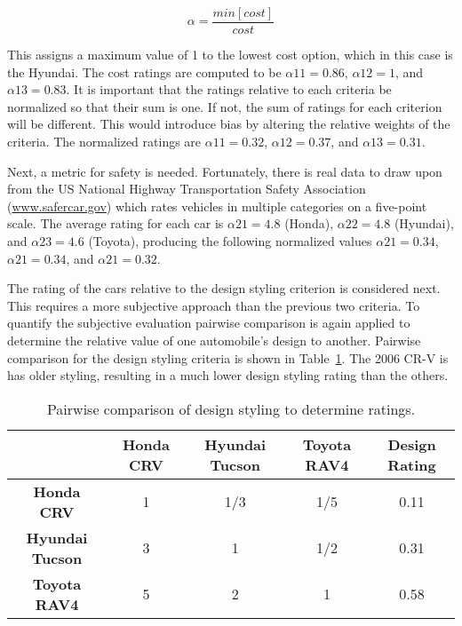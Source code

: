 \begin{equation}
\label{equ:costRatio}
\alpha = \frac{min[cost]}{cost}
\end{equation}

This assigns a maximum value of 1 to the lowest cost option, which in
this case is the Hyundai. The cost ratings are computed to be
$\alpha{11} = 0.86$,
$\alpha{12} =  1$, and
$\alpha{13} =  0.83$. It is important that the
ratings relative to each criteria be normalized so that their sum is
one. If not, the sum of ratings for each criterion will be different.
This would introduce bias by altering the relative weights of the
criteria. The normalized ratings are
$\alpha{11} =  0.32$,
$\alpha{12} =  0.37$, and
$\alpha{13} =  0.31$.

Next, a metric for safety is needed. Fortunately, there is real data to
draw upon from the US National Highway Transportation Safety Association
(\href{http://www.safercar.gov}{www.safercar.gov}) which rates vehicles
in multiple categories on a five-point scale. The average rating for
each car is 
$\alpha{21} =  4.8$ (Honda),
$\alpha{22} =4.8$ (Hyundai), and
$\alpha{23} = 4.6$ (Toyota), 
producing the following normalized values 
$\alpha{21} = 0.34$, 
$\alpha{21} = 0.34$, and
$\alpha{21} = 0.32$.

The rating of the cars relative to the design styling criterion is
considered next. This requires a more subjective approach than the
previous two criteria. To quantify the subjective evaluation pairwise
comparison is again applied to determine the relative value of one
automobile's design to another. Pairwise comparison for the design
styling criteria is shown in Table~\ref{table:pairwiseCompareDesignRatings}. 
The 2006 CR-V is has older styling, resulting in a much lower design
styling rating than the others.



\begin{table}[h]
\caption{Pairwise comparison of design styling to determine ratings.}
\label{table:pairwiseCompareDesignRatings}

\begin{tabular}{|c|c|c|c|c|}
\hline
\rowcolor{Gray}
			 & \textbf{Honda CRV}  & \textbf{Hyundai Tucson} & \textbf{Toyota RAV4} & \textbf{Design Rating}\\ \hline

\textbf{Honda CRV} 			& 1 & 1/3 & 1/5 & 0.11 \\ \hline
\textbf{Hyundai Tucson} 	& 3 & 1 & 1/2 & 0.31 \\ \hline
\textbf{Toyota RAV4}		& 5 & 2 & 1 & 0.58 \\ \hline
\end{tabular}
\end{table}

